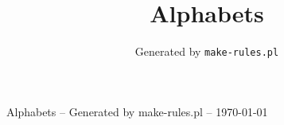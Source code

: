\documentclass{article}
\begin{document}
\title{Alphabets}
\author{Generated by \tt make-rules.pl}
\begin{center}
  {\LARGE Alphabets} --
  {\Large Generated by make-rules.pl} --
  \large \today
\end{center}
\tableofcontents
\newpage

\end{document}
